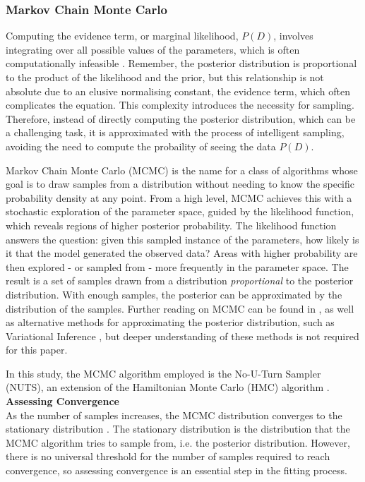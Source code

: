 \subsubsection{Markov Chain Monte Carlo}

Computing the evidence term, or marginal likelihood, $P(D)$, involves
integrating over all possible values of the parameters, which is often
computationally infeasible \cite{mcmc}. Remember, the posterior distribution is
proportional to the product of the likelihood and the prior, but this
relationship is not absolute due to an elusive normalising constant, the
evidence term, which often complicates the equation. This complexity introduces
the necessity for sampling. Therefore, instead of directly computing the posterior
distribution, which can be a challenging task, it is approximated with the
process of intelligent sampling, avoiding the need to compute the probaility of seeing the data $P(D)$. 

Markov Chain Monte Carlo (MCMC) is the name for a class of algorithms whose
goal is to draw samples from a distribution without needing to know the
specific probability density at any point. From a high level, MCMC achieves
this with a stochastic exploration of the parameter space, guided by the
likelihood function, which reveals regions of higher posterior probability. The
likelihood function answers the question: given this sampled instance of the
parameters, how likely is it that the model generated the observed data?
Areas with higher probability are then explored - or sampled from - more
frequently in the parameter space. The result is a set of samples drawn from a
distribution \textit{proportional} to the posterior distribution. With enough
samples, the posterior can be approximated by the distribution of the samples.
Further reading on MCMC can be found in \cite{mcmc}, as well as alternative
methods for approximating the posterior distribution, such as Variational
Inference \cite{vi}, but deeper understanding of these methods is not required
for this paper.

In this study, the MCMC algorithm employed is the No-U-Turn Sampler (NUTS), an
extension of the Hamiltonian Monte Carlo (HMC) algorithm \cite{nuts}. 
\textbf{Assessing Convergence}\\
As the number of samples increases, the MCMC distribution converges to the
stationary distribution \cite{mcmc}. The stationary distribution is the distribution that 
the MCMC algorithm tries to sample from, i.e. the posterior distribution. 
However, there is no universal threshold for the number of samples required to
reach convergence, so assessing convergence is an essential step in the fitting
process. 

